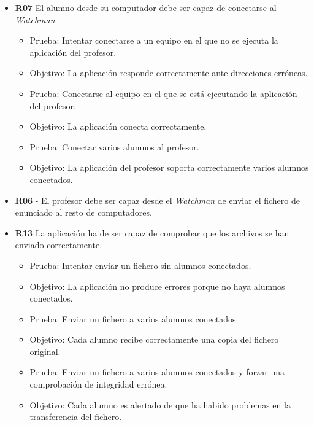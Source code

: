 \begin{itemize}


    \item {\bfseries R07} El alumno desde su computador debe ser capaz de conectarse al \emph{Watchman}.

    \begin{itemize}
        \item Prueba: Intentar conectarse a un equipo en el que no se ejecuta la aplicación del profesor.
        \item Objetivo: La aplicación responde correctamente ante direcciones erróneas.
        \newline

        \item Prueba: Conectarse al equipo en el que se está ejecutando la aplicación del profesor.
        \item Objetivo: La aplicación conecta correctamente.
        \newline

        \item Prueba: Conectar varios alumnos al profesor.
        \item Objetivo: La aplicación del profesor soporta correctamente varios alumnos conectados.

    \end{itemize}

    \item {\bfseries R06} -  El profesor debe ser capaz desde el \emph{Watchman} de enviar el fichero de enunciado al resto de computadores.
        \newline

    \item  {\bfseries R13} La aplicación ha de ser capaz de comprobar que los archivos se han enviado correctamente.

    \begin{itemize}

        \item Prueba: Intentar enviar un fichero sin alumnos conectados.
        \item Objetivo: La aplicación no produce errores porque no haya alumnos conectados.
        \newline

        \item Prueba: Enviar un fichero a varios alumnos conectados.
        \item Objetivo: Cada alumno recibe correctamente una copia del fichero original.
        \newline

        \item Prueba: Enviar un fichero a varios alumnos conectados y forzar una comprobación de integridad errónea.
        \item Objetivo: Cada alumno es alertado de que ha habido problemas en la transferencia del fichero.

    \end{itemize}

\end{itemize}

